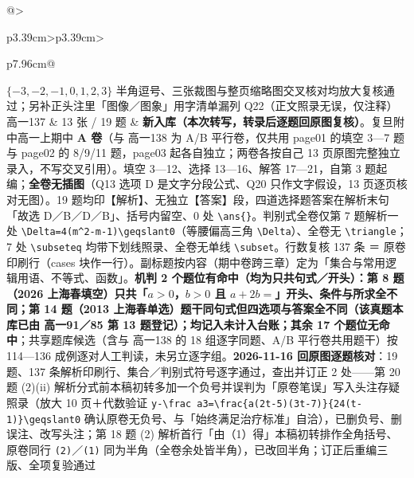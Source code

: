 \documentclass[a4paper,11pt]{article}
\begin{document}
\begin{xltabular}{\textwidth}{@{}>{\raggedright\arraybackslash}p{3.39cm}>{\centering\arraybackslash}p{3.39cm}>{\raggedright\arraybackslash}p{7.96cm}@{}}
\(\{-3,\allowbreak -2,\allowbreak -1,\allowbreak 0,\allowbreak 1,\allowbreak 2,\allowbreak 3\}\) 半角逗号、三张裁图与整页缩略图交叉核对均放大复核通过；另补正头注里「图像／图象」用字清单漏列 Q22（正文照录无误，仅注释） \\ \addlinespace[1pt]
高一137 & 13 张 / 19 题 & \textbf{新入库（本次转写，转录后逐题回原图复核）}。复旦附中高一上期中 \textbf{A 卷}（与 高一138 为 A/B 平行卷，仅共用 page01 的填空 3---7 题与 page02 的 8/9/11 题，page03 起各自独立；两卷各按自己 13 页原图完整独立录入，不写交叉引用）。填空 3---12、选择 13---16、解答 17---21，自第 3 题起编；\textbf{全卷无插图}（Q13 选项 D 是文字分段公式、Q20 只作文字假设，13 页逐页核对无图）。19 题均印【解析】、无独立【答案】段，四道选择题答案在解析末句「故选 D／B／D／B」、括号内留空、0 处 \texttt{\textbackslash{}ans\{\}}。判别式全卷仅第 7 题解析一处 \texttt{\textbackslash{}Delta=4(m\^{}2-\allowbreak{}m-\allowbreak{}1)\textbackslash{}geqslant0}（等腰偏高三角 \texttt{\textbackslash{}Delta}）、全卷无 \texttt{\textbackslash{}triangle}；7 处 \texttt{\textbackslash{}subseteq} 均带下划线照录、全卷无单线 \texttt{\textbackslash{}subset}。行数复核 137 条 ＝ 原卷印刷行（cases 块作一行）。副标题按内容（期中卷跨三章）定为「集合与常用逻辑用语、不等式、函数」。\textbf{机判 2 个题位有命中（均为只共句式／开头）：第 8 题（2026 上海春填空）只共「\(a>0\)，\(b>0\) 且 \(a+\allowbreak 2b=\allowbreak \)」开头、条件与所求全不同；第 14 题（2013 上海春单选）题干同句式但四选项与答案全不同（该真题本库已由 高一91／85 第 13 题登记）；均记入未计入台账；其余 17 个题位无命中}；共享题库候选（含与 高一138 的 18 组逐字同题、A/B 平行卷共用题干）按 114---136 成例逐对人工判读，未另立逐字组。\textbf{2026-11-16 回原图逐题核对}：19 题、137 条解析印刷行、集合／判别式符号逐字通过，查出并订正 2 处------第 20 题 (2)(ii) 解析分式前本稿初转多加一个负号并误判为「原卷笔误」写入头注存疑照录（放大 10 页＋代数验证 \texttt{y-\allowbreak{}\textbackslash{}frac\ a3=\textbackslash{}frac\{a(2t-\allowbreak{}5)(3t-\allowbreak{}7)\}\{24(t-\allowbreak{}1)\}\textbackslash{}geqslant0} 确认原卷无负号、与「始终满足治疗标准」自洽），已删负号、删误注、改写头注；第 18 题 (2) 解析首行「由（1）得」本稿初转排作全角括号、原卷同行 \texttt{(2)}／\texttt{(1)} 同为半角（全卷余处皆半角），已改回半角；订正后重编三版、全项复验通过 \\ \addlinespace[1pt]

\end{xltabular}
\end{document}

